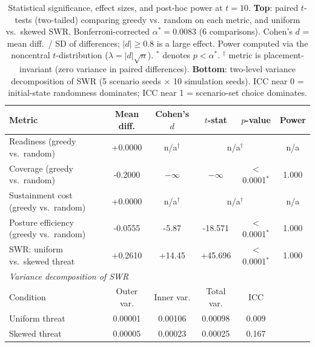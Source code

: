 \begin{table}[htbp]
\centering
\caption{Statistical significance, effect sizes, and post-hoc power at $t = 10$. \textbf{Top}: paired $t$-tests (two-tailed) comparing greedy vs.\ random on each metric, and uniform vs.\ skewed SWR. Bonferroni-corrected $\alpha^* = 0.0083$ (6 comparisons). Cohen's $d$ = mean diff.\ / SD of differences; $|d| \geq 0.8$ is a large effect. Power computed via the noncentral $t$-distribution ($\lambda = |d|\sqrt{n}$). $^{{*}}$ denotes $p < \alpha^*$. $^{{\dagger}}$ metric is placement-invariant (zero variance in paired differences). \textbf{Bottom}: two-level variance decomposition of SWR (5 scenario seeds $\times$ 10 simulation seeds). ICC near 0 = initial-state randomness dominates; ICC near 1 = scenario-set choice dominates.}
\label{tab:exp1_significance}
\begin{tabular}{lccccc}
\hline
Metric & Mean diff. & Cohen's $d$ & $t$-stat & $p$-value & Power \\
\hline
        Readiness (greedy vs.\ random) & +0.0000 & n/a$^{\dagger}$ & \multicolumn{2}{c}{n/a$^{\dagger}$} & n/a \\
        Coverage (greedy vs.\ random) & -0.2000 & $-\infty$ & $-\infty$ & $<$0.0001$^{*}$ & 1.000 \\
        Sustainment cost (greedy vs.\ random) & +0.0000 & n/a$^{\dagger}$ & \multicolumn{2}{c}{n/a$^{\dagger}$} & n/a \\
        Posture efficiency (greedy vs.\ random) & -0.0555 & -5.87 & -18.571 & $<$0.0001$^{*}$ & 1.000 \\
        SWR: uniform vs.\ skewed threat & +0.2610 & +14.45 & +45.696 & $<$0.0001$^{*}$ & 1.000 \\
\hline
\multicolumn{6}{l}{\textit{Variance decomposition of SWR}} \\
\hline
Condition & Outer var. & Inner var. & Total var. & ICC & \\
\hline
        Uniform threat & 0.00001 & 0.00106 & 0.00098 & 0.009 & \\
        Skewed threat & 0.00005 & 0.00023 & 0.00025 & 0.167 & \\
\hline
\end{tabular}
\end{table}
